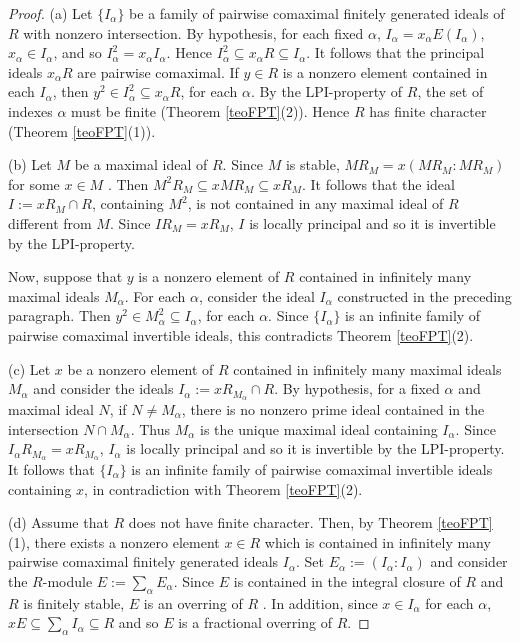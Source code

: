 \documentclass[12pt]{amsart}
\theoremstyle{definition}
\begin{document}
\begin{proof} (a) Let $\{I_{\alpha}\}$ be a family of pairwise comaximal finitely generated ideals of $R$ with nonzero intersection. By hypothesis, for each fixed ${\alpha}$,  $I_{\alpha}=x_{\alpha} E(I_{\alpha})$, $x_{\alpha}\in I_{\alpha}$, and so $I_{\alpha}^2=x_{\alpha} I_{\alpha}$. Hence $I_{\alpha}^2{\subseteq} x_{\alpha} R{\subseteq} I_{\alpha}$. It follows that the principal ideals $x_{\alpha} R$ are  pairwise comaximal.  If $y\in R$ is a nonzero element contained in each $I_{\alpha}$, then $y^2\in I_{\alpha}^2{\subseteq} x_{\alpha} R$, for each ${\alpha}$. By the LPI-property of $R$, the set of indexes ${\alpha}$ must be finite (Theorem \ref{teoFPT}(2)). Hence $R$ has finite character (Theorem \ref{teoFPT}(1)).

(b) Let $M$ be a maximal ideal of $R$. Since $M$ is stable,  $MR_M=x(MR_M:MR_M)$ for some $x\in M$ \cite[Lemma 3.1]{O2}. Then $M^2R_M{\subseteq} xMR_M{\subseteq} xR_M$. 
It follows that the ideal $I:=xR_M\cap R$, containing $M^2$, is not contained in any maximal ideal of $R$ different from $M$. Since $IR_M=xR_M$,  $I$ is locally principal and so it is invertible by the LPI-property. 

Now, suppose that $y$ is a nonzero element of $R$ contained in infinitely many maximal ideals $M_{\alpha}$. For each ${\alpha}$, consider the ideal $I_{\alpha}$ constructed in the preceding paragraph. Then $y^2\in M_{\alpha}^2{\subseteq} I_{\alpha}$, for each ${\alpha}$.
Since $\{I_{\alpha}\}$ is an infinite family of pairwise comaximal invertible ideals, this contradicts Theorem \ref{teoFPT}(2).

(c) Let $x$ be a nonzero element of $R$ contained in infinitely many maximal ideals $M_{\alpha}$ and consider the ideals $I_{\alpha}:=xR_{M_{\alpha}}\cap R$. By hypothesis, for a fixed ${\alpha}$ and maximal ideal $N$, if $N\neq M_{\alpha}$,   there is no nonzero prime ideal contained in the intersection $N\cap M_{\alpha}$. Thus $M_{\alpha}$ is the unique maximal  ideal containing $I_{\alpha}$. Since $I_{\alpha} R_{M_{\alpha}}=xR_{M_{\alpha}}$,  $I_{\alpha}$ is locally principal and so it is invertible  by the LPI-property. 
It follows that $\{I_{\alpha}\}$ is an infinite family of pairwise comaximal invertible ideals containing $x$, in contradiction with Theorem \ref{teoFPT}(2).

(d) Assume that $R$ does not have finite character. Then, by  Theorem \ref{teoFPT}(1), there exists a  nonzero element $x\in R$ which is contained in infinitely many pairwise comaximal finitely generated ideals $I_{\alpha}$. Set $E_{\alpha}:=(I_{\alpha}:I_{\alpha})$ and consider the $R$-module $E:=\sum_{\alpha} E_{\alpha}$. Since $E$ is contained in the integral closure of $R$ and $R$ is finitely stable, $E$ is an overring of $R$ \cite[Proposition 2.1]{Rush}.
In addition, since $x\in I_{\alpha}$ for each ${\alpha}$, $xE{\subseteq} \sum_{\alpha} I_{\alpha}{\subseteq} R$ and so $E$ is a fractional overring of $R$. 


\end{proof}
\end{document}
